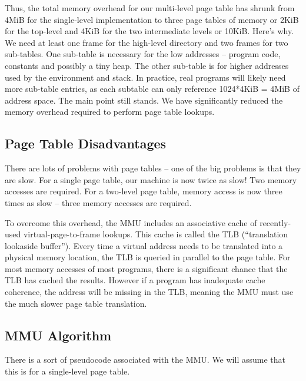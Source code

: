 Thus, the total memory overhead for our multi-level page table has shrunk from 4MiB for the single-level implementation to three page tables of memory or 2KiB for the top-level and 4KiB for the two intermediate levels or 10KiB.
Here's why.
We need at least one frame for the high-level directory and two frames for two sub-tables.
One sub-table is necessary for the low addresses -- program code, constants and possibly a tiny heap.
The other sub-table is for higher addresses used by the environment and stack.
In practice, real programs will likely need more sub-table entries, as each subtable can only reference 1024*4KiB = 4MiB of address space.
The main point still stands.
We have significantly reduced the memory overhead required to perform page table lookups.

\subsection{Page Table Disadvantages}

There are lots of problems with page tables -- one of the big problems is that they are slow.
For a single page table, our machine is now twice as slow!
Two memory accesses are required.
For a two-level page table, memory access is now three times as slow -- three memory accesses are required.

To overcome this overhead, the MMU includes an associative cache of recently-used virtual-page-to-frame lookups.
This cache is called the TLB (``translation lookaside buffer'').
Every time a virtual address needs to be translated into a physical memory location, the TLB is queried in parallel to the page table.
For most memory accesses of most programs, there is a significant chance that the TLB has cached the results.
However if a program has inadequate cache coherence, the address will be missing in the TLB, meaning the MMU must use the much slower page table translation.

\subsection{MMU Algorithm}

There is a sort of pseudocode associated with the MMU.
We will assume that this is for a single-level page table.

